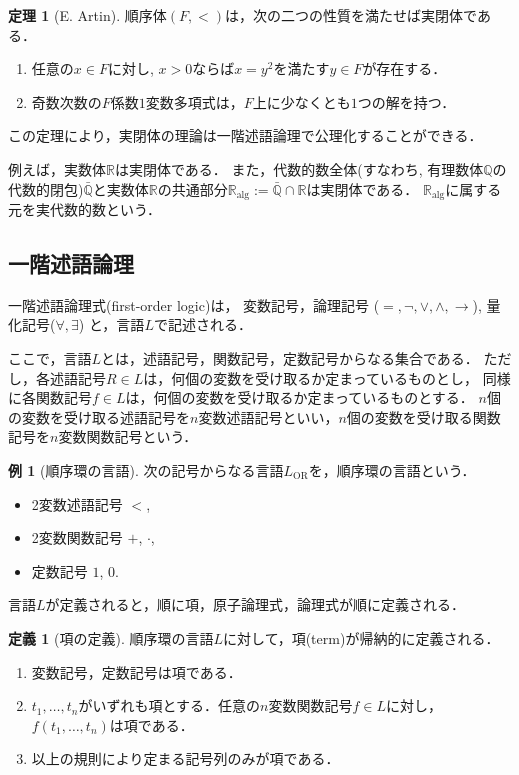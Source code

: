 \documentclass[uplatex, dvipdfmx]{jsarticle}
\newcommand{\R}{\mathbb{R}}
\newcommand{\Q}{\mathbb{Q}}
\newcommand{\Ralg}{\mathbb{R}_\mathrm{alg}}
\theoremstyle{definition}
\newtheorem{definition}{定義}[section]
\newtheorem{theorem}{定理}[section]
\newtheorem{example}{例}[section]
\begin{document}
\begin{theorem}[E. Artin]
     順序体$(F,<)$は，次の二つの性質を満たせば実閉体である．
     \begin{enumerate}
          \item 任意の$x \in F$に対し, $x>0$ならば$x = y^2$を満たす$y \in F$が存在する．
          \item 奇数次数の$F$係数$1$変数多項式は，$F$上に少なくとも$1$つの解を持つ．
     \end{enumerate}
\end{theorem}

この定理により，実閉体の理論は一階述語論理で公理化することができる．

例えば，実数体$\R$は実閉体である．
また，代数的数全体(すなわち, 有理数体$\Q$の代数的閉包)$\bar{\Q}$と実数体$\R$の共通部分$\Ralg := \bar{\Q} \cap \R$は実閉体である．
$\Ralg$に属する元を実代数的数という．

\subsection{一階述語論理}
一階述語論理式(first-order logic)は，
変数記号，論理記号 ($=, \lnot, \lor, \land, \rightarrow$), 量化記号($\forall, \exists$)
と，言語$L$で記述される．

ここで，言語$L$とは，述語記号，関数記号，定数記号からなる集合である．
ただし，各述語記号$R \in L$は，何個の変数を受け取るか定まっているものとし，
同様に各関数記号$f \in L$は，何個の変数を受け取るか定まっているものとする．
$n$個の変数を受け取る述語記号を$n$変数述語記号といい，$n$個の変数を受け取る関数記号を$n$変数関数記号という．

\begin{example}[順序環の言語]
     次の記号からなる言語$L_\mathrm{OR}$を，順序環の言語という．
     \begin{itemize}
          \item 2変数述語記号 $<$,
          \item 2変数関数記号 $+$, $\cdot$,
          \item 定数記号 $1$, $0$.
     \end{itemize}
\end{example}

言語$L$が定義されると，順に項，原子論理式，論理式が順に定義される．

\begin{definition}[項の定義]
     順序環の言語$L$に対して，項(term)が帰納的に定義される．
     \begin{enumerate}
          \item 変数記号，定数記号は項である．
          \item $t_1, \dots, t_n$がいずれも項とする．任意の$n$変数関数記号$f \in L$に対し，$f(t_1, \dots, t_n)$は項である．
          \item 以上の規則により定まる記号列のみが項である．
     \end{enumerate}
\end{definition}
\end{document}

